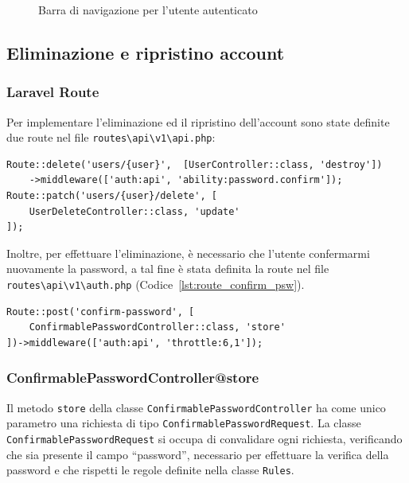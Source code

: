 \begin{figure}[htbp]
	\centering
	\fboxsep=0.5pt
	\fboxrule=0.5pt
	\caption{Barra di navigazione per l'utente autenticato}
	\label{fig:nav-bar-auth}
\end{figure}

\subsection{Eliminazione e ripristino account}

\subsubsection{Laravel Route}
Per implementare l'eliminazione ed il ripristino dell'account sono state definite due route nel file \verb|routes\api\v1\api.php|:
\begin{lstlisting}[caption={Route per l'eliminazione e ripristino dell'account}, label={lst:route_user_delete}]
Route::delete('users/{user}',  [UserController::class, 'destroy'])
	->middleware(['auth:api', 'ability:password.confirm']);
Route::patch('users/{user}/delete', [
	UserDeleteController::class, 'update'
]);
\end{lstlisting}
Inoltre, per effettuare l'eliminazione, \`e necessario che l'utente confermarmi nuovamente la password, a tal fine \`e stata definita la route nel file \verb|routes\api\v1\auth.php| (Codice~\ref{lst:route_confirm_psw}).
\begin{lstlisting}[caption={Route per la conferma della password}, label={lst:route_confirm_psw}]
Route::post('confirm-password', [
	ConfirmablePasswordController::class, 'store'
])->middleware(['auth:api', 'throttle:6,1']);
\end{lstlisting}

\subsubsection{ConfirmablePasswordController@store}
Il metodo \verb|store| della classe \verb|ConfirmablePasswordController| ha come unico parametro una richiesta di tipo \verb|ConfirmablePasswordRequest|. La classe \verb|ConfirmablePasswordRequest| si occupa di convalidare ogni richiesta, verificando che sia presente il campo ``password'', necessario per effettuare la verifica della password e che rispetti le regole definite nella classe \verb|Rules|.

